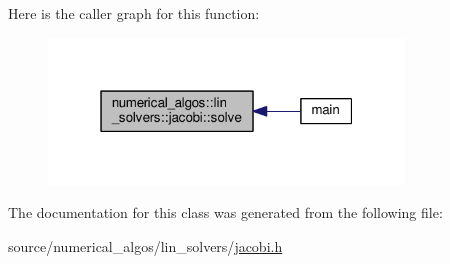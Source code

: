Here is the caller graph for this function\-:
\nopagebreak
\begin{figure}[H]
\begin{center}
\leavevmode
\includegraphics[width=268pt]{classnumerical__algos_1_1lin__solvers_1_1jacobi_aebc8f746eb9b5f412c6ea79a4149621f_icgraph}
\end{center}
\end{figure}




The documentation for this class was generated from the following file\-:\begin{DoxyCompactItemize}
\item 
source/numerical\-\_\-algos/lin\-\_\-solvers/\hyperlink{jacobi_8h}{jacobi.\-h}\end{DoxyCompactItemize}
